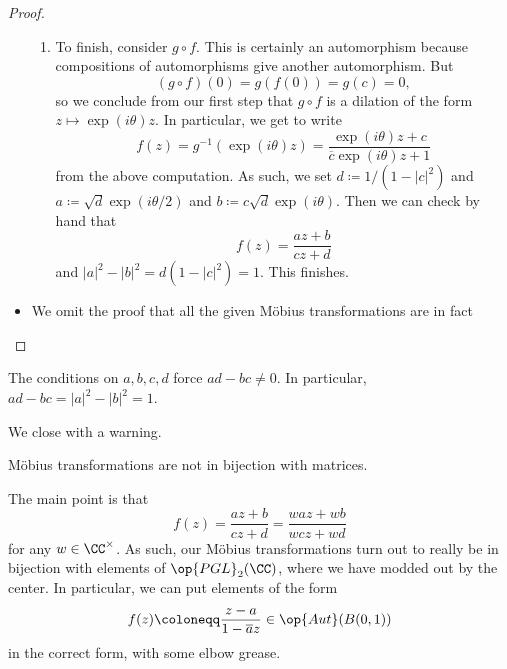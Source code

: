 \begin{proof}
\begin{itemize}
\begin{enumerate}
			\item To finish, consider $g\circ f$. This is certainly an automorphism because compositions of automorphisms give another automorphism. But
			\[(g\circ f)(0)=g(f(0))=g(c)=0,\]
			so we conclude from our first step that $g\circ f$ is a dilation of the form $z\mapsto\exp(i\theta)z$. In particular, we get to write
			\[f(z)=g^{-1}(\exp(i\theta)z)=\frac{\exp(i\theta)z+c}{\overline c\exp(i\theta)z+1}\]
			from the above computation. As such, we set $d\coloneqq 1/\left(1-|c|^2\right)$ and $a\coloneqq\sqrt d\exp(i\theta/2)$ and $b\coloneqq c\sqrt d\exp(i\theta)$. Then we can check by hand that
			\[f(z)=\frac{az+b}{cz+d}\]
			and $|a|^2-|b|^2=d\left(1-|c|^2\right)=1$. This finishes.
		\end{enumerate}
		\item We omit the proof that all the given M\"obius transformations are in fact 
	\end{itemize}
\end{proof}
\begin{remark}
	The conditions on $a,b,c,d$ force $ad-bc\ne0$. In particular, $ad-bc=|a|^2-|b|^2=1$.
\end{remark}
We close with a warning.
\begin{warn}
	M\"obius transformations are not in bijection with matrices.
\end{warn}
The main point is that
\[f(z)=\frac{az+b}{cz+d}=\frac{waz+wb}{wcz+wd}\]
for any $w\in\CC^\times$. As such, our M\"obius transformations turn out to really be in bijection with elements of $\op{PGL}_2(\CC)$, where we have modded out by the center. In particular, we can put elements of the form
\[f(z)\coloneqq\frac{z-a}{1-\overline az}\in\op{Aut}(B(0,1))\]
in the correct form, with some elbow grease.